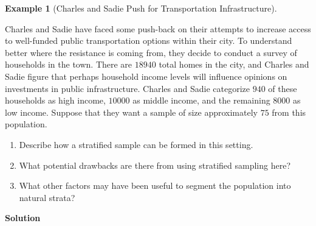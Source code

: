 \documentclass[
  letterpaper,
  DIV=11,
  numbers=noendperiod]{scrreprt}
\providecommand{\tightlist}{%
  \setlength{\itemsep}{0pt}\setlength{\parskip}{0pt}}\usepackage{longtable,booktabs,array}
\theoremstyle{definition}
\theoremstyle{definition}
\newtheorem{example}{Example}[chapter]
\theoremstyle{definition}
\theoremstyle{remark}
\begin{document}
\begin{example}[Charles and Sadie Push for Transportation
Infrastructure]\protect\hypertarget{exm-stratified-sampling}{}\label{exm-stratified-sampling}

Charles and Sadie have faced some push-back on their attempts to
increase access to well-funded public transportation options within
their city. To understand better where the resistance is coming from,
they decide to conduct a survey of households in the town. There are
\(18940\) total homes in the city, and Charles and Sadie figure that
perhaps household income levels will influence opinions on investments
in public infrastructure. Charles and Sadie categorize \(940\) of these
households as high income, \(10000\) as middle income, and the remaining
\(8000\) as low income. Suppose that they want a sample of size
approximately \(75\) from this population.

\begin{enumerate}
\def\labelenumi{\alph{enumi}.}
\tightlist
\item
  Describe how a stratified sample can be formed in this setting.
\item
  What potential drawbacks are there from using stratified sampling
  here?
\item
  What other factors may have been useful to segment the population into
  natural strata?
\end{enumerate}

\begin{tcolorbox}[enhanced jigsaw, colback=white, colframe=quarto-callout-color-frame, arc=.35mm, leftrule=.75mm, rightrule=.15mm, opacityback=0, breakable, bottomrule=.15mm, left=2mm, toprule=.15mm]

\vspace{-3mm}\textbf{Solution}\vspace{3mm}


\end{tcolorbox}
\end{example}
\end{document}
